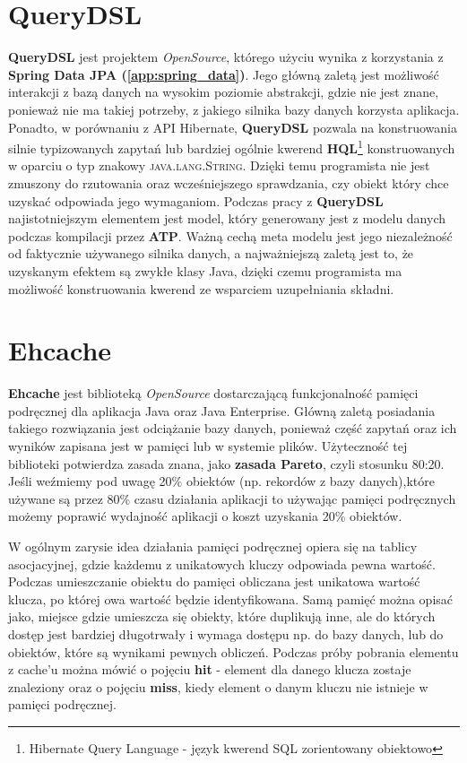 \section{QueryDSL}
	\textbf{QueryDSL} jest projektem \textit{OpenSource}, którego użyciu wynika z korzystania z \textbf{Spring Data JPA (\ref{app:spring_data})}. Jego główną zaletą jest możliwość interakcji z bazą danych na wysokim poziomie abstrakcji, gdzie nie jest znane, ponieważ nie ma takiej potrzeby, z jakiego silnika bazy danych korzysta aplikacja. Ponadto, w porównaniu z API Hibernate, \textbf{QueryDSL} pozwala na konstruowania silnie typizowanych zapytań lub bardziej ogólnie kwerend \textbf{HQL}\footnote{Hibernate Query Language - język kwerend SQL zorientowany obiektowo} konstruowanych w oparciu o typ znakowy \textsc{java.lang.String}. Dzięki temu programista nie jest zmuszony do rzutowania oraz wcześniejszego sprawdzania, czy obiekt który chce uzyskać odpowiada jego wymaganiom. Podczas pracy z \textbf{QueryDSL} najistotniejszym elementem jest model, który generowany jest z modelu danych podczas kompilacji przez \textbf{ATP}. Ważną cechą meta modelu jest jego niezależność od faktycznie używanego silnika danych, a najważniejszą zaletą jest to, że uzyskanym efektem są zwykłe klasy Java, dzięki czemu programista ma możliwość konstruowania kwerend ze wsparciem uzupełniania składni. 
	
\section{Ehcache}
	\textbf{Ehcache} jest biblioteką \textit{OpenSource} dostarczającą funkcjonalność pamięci podręcznej dla aplikacja Java oraz Java Enterprise. Główną zaletą posiadania takiego rozwiązania jest odciążanie bazy danych, ponieważ 	część zapytań oraz ich wyników zapisana jest w pamięci lub w systemie plików. Użyteczność tej biblioteki potwierdza zasada znana, jako \textbf{zasada Pareto}, czyli stosunku 80:20. Jeśli weźmiemy pod uwagę 20\% obiektów (np. rekordów z bazy danych),które używane są przez 80\% czasu działania aplikacji to używając pamięci podręcznych możemy poprawić wydajność aplikacji o koszt uzyskania 20\% obiektów.
	
	W ogólnym zarysie idea działania pamięci podręcznej opiera się na tablicy asocjacyjnej, gdzie każdemu z unikatowych kluczy odpowiada pewna wartość. Podczas umieszczanie obiektu do pamięci obliczana jest unikatowa wartość klucza, po której owa wartość będzie identyfikowana. Samą pamięć można opisać jako, miejsce gdzie umieszcza się obiekty, które duplikują inne, ale do których dostęp jest bardziej długotrwały i wymaga dostępu np. do bazy danych, lub do obiektów, które są wynikami pewnych obliczeń. Podczas próby pobrania elementu z cache'u można mówić o pojęciu \textbf{hit} - element dla danego klucza zostaje znaleziony oraz o pojęciu \textbf{miss}, kiedy element o danym kluczu nie istnieje w pamięci podręcznej.\cite{ehcache_documentation_ref}
	
